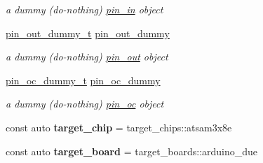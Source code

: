 \begin{DoxyCompactItemize}
\begin{DoxyCompactList}\small\item\em a dummy (do-\/nothing) \hyperlink{classhwlib_1_1pin__in}{pin\+\_\+in} object \end{DoxyCompactList}\item 
\mbox{\label{namespacehwlib_a61238c70def9e482f316de1cba4401b7}} 
\hyperlink{classhwlib_1_1pin__out__dummy__t}{pin\+\_\+out\+\_\+dummy\+\_\+t} \hyperlink{namespacehwlib_a61238c70def9e482f316de1cba4401b7}{pin\+\_\+out\+\_\+dummy}
\begin{DoxyCompactList}\small\item\em a dummy (do-\/nothing) \hyperlink{classhwlib_1_1pin__out}{pin\+\_\+out} object \end{DoxyCompactList}\item 
\mbox{\label{namespacehwlib_a56c2e1c8df25a3fe5db02c83940acbfc}} 
\hyperlink{classhwlib_1_1pin__oc__dummy__t}{pin\+\_\+oc\+\_\+dummy\+\_\+t} \hyperlink{namespacehwlib_a56c2e1c8df25a3fe5db02c83940acbfc}{pin\+\_\+oc\+\_\+dummy}
\begin{DoxyCompactList}\small\item\em a dummy (do-\/nothing) \hyperlink{classhwlib_1_1pin__oc}{pin\+\_\+oc} object \end{DoxyCompactList}\item 
\mbox{\label{namespacehwlib_a38b6b0445f82e91a09a20486fd909382}} 
const auto {\bfseries target\+\_\+chip} = target\+\_\+chips\+::atsam3x8e
\item 
\mbox{\label{namespacehwlib_a391d0dc84553228bf97052c74ae954af}} 
const auto {\bfseries target\+\_\+board} = target\+\_\+boards\+::arduino\+\_\+due
\end{DoxyCompactItemize}
\textbf{ }\par
